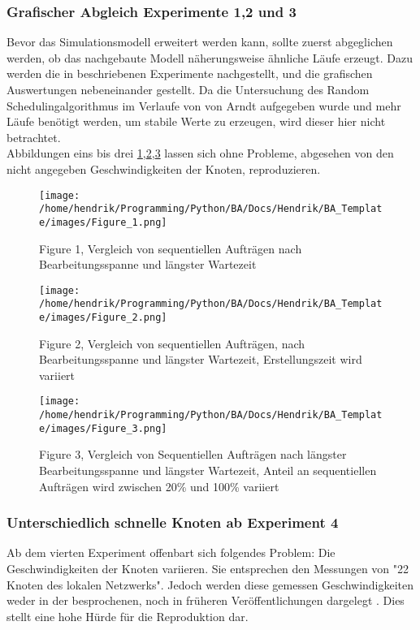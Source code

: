 \subsubsection{Grafischer Abgleich Experimente 1,2 und 3}
Bevor das Simulationsmodell erweitert werden kann, sollte zuerst abgeglichen werden, ob das nachgebaute Modell näherungsweise ähnliche Läufe erzeugt. Dazu werden die in \cite{Arn99} beschriebenen Experimente nachgestellt, und die grafischen Auswertungen nebeneinander gestellt.
Da die Untersuchung des Random Schedulingalgorithmus im Verlaufe von \cite{Arn99} von Arndt aufgegeben wurde und mehr Läufe benötigt werden, um stabile Werte zu erzeugen, wird dieser hier nicht betrachtet.\\
Abbildungen eins bis drei \ref{figure1},\ref{figure2},\ref{figure3} lassen sich ohne Probleme, abgesehen von den nicht angegeben Geschwindigkeiten der Knoten, reproduzieren.
\begin{figure}
\centering
\texttt{[image: /home/hendrik/Programming/Python/BA/Docs/Hendrik/BA\_Template/images/Figure\_1.png]}
\caption{Figure 1, Vergleich von sequentiellen Aufträgen nach Bearbeitungsspanne und längster Wartezeit}
\label{figure1}
\end{figure}
\begin{figure}
	\centering
	\texttt{[image: /home/hendrik/Programming/Python/BA/Docs/Hendrik/BA\_Template/images/Figure\_2.png]}
	\caption{Figure 2, Vergleich von sequentiellen Aufträgen, nach Bearbeitungsspanne und längster Wartezeit, Erstellungszeit wird variiert}
	\label{figure2}
\end{figure}
\begin{figure}
	\centering
	\texttt{[image: /home/hendrik/Programming/Python/BA/Docs/Hendrik/BA\_Template/images/Figure\_3.png]}
	\caption{Figure 3, Vergleich von Sequentiellen Aufträgen nach längster Bearbeitungsspanne und längster Wartezeit, Anteil an sequentiellen Aufträgen wird zwischen 20\% und 100\% variiert}
	\label{figure3}
\end{figure}

\FloatBarrier

\subsubsection{Unterschiedlich schnelle Knoten ab Experiment 4}
Ab dem vierten Experiment offenbart sich folgendes Problem: Die Geschwindigkeiten der Knoten variieren. Sie entsprechen den Messungen von "22 Knoten des lokalen Netzwerks". Jedoch werden diese gemessen Geschwindigkeiten weder in der besprochenen, noch in früheren Veröffentlichungen dargelegt \cite{norepr1,norepr2}. Dies stellt eine hohe Hürde für die Reproduktion dar.\\

